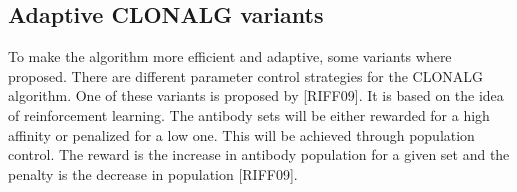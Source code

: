\subsection{Adaptive CLONALG variants}
To make the algorithm more efficient and adaptive, some variants where proposed. There are different parameter control strategies for the CLONALG algorithm. One of these variants is proposed by [RIFF09]. It is based on the idea of reinforcement learning. The antibody sets will be either rewarded for a high affinity or penalized for a low one. This will be achieved through population control. The reward is the increase in antibody population for a given set and the penalty is the decrease in population [RIFF09]. 
 





